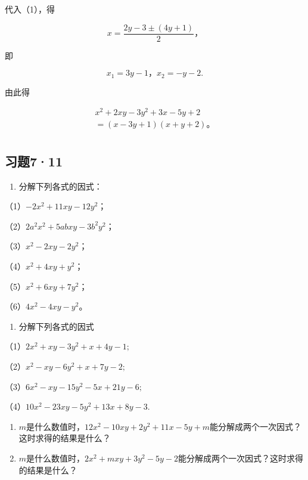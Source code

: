 代入（1），得

\[
x = \frac{2 y - 3 \pm (4 y + 1)}{2}\text{，}
\]

即

\[
x _ {1} = 3 y - 1\text{，} x _ {2} = - y - 2.
\]

由此得

\[
\begin{array}{l} x ^ {2} + 2 x y - 3 y ^ {2} + 3 x - 5 y + 2 \\ = (x - 3 y + 1) (x + y + 2)\text{。} \\ \end{array}
\]

\subsection{习题7·11}

\begin{enumerate}
\item
  分解下列各式的因式：
\end{enumerate}

（1）\(-2x^{2} + 11xy - 12y^{2}\)；

（2）\(2a^{2}x^{2} + 5abxy - 3b^{2}y^{2}\)；

（3）\(x^{2} - 2xy - 2y^{2}\)；

（4）\(x^{2} + 4xy + y^{2}\)；

（5）\(x^{2} + 6xy + 7y^{2}\)；

（6）\(4x^{2} - 4xy - y^{2}\)。

\begin{enumerate}[start=2]
\item
  分解下列各式的因式
\end{enumerate}

（1）\(2x^{2} + xy - 3y^{2} + x + 4y - 1;\)

（2）\(x^{2} - xy - 6y^{2} + x + 7y - 2;\)

（3）\(6x^{2} - xy - 15y^{2} - 5x + 21y - 6;\)

（4）\(10x^{2} - 23xy - 5y^{2} + 13x + 8y - 3.\)

\begin{enumerate}[start=3,label={*\arabic*.}]
\item
\(m\)是什么数值时，\(12x^{2} - 10xy + 2y^{2} + 11x - 5y + m\)能分解成两个一次因式？这时求得的结果是什么？

\item
\(m\)是什么数值时，\(2x^{2} + mxy + 3y^{2} - 5y - 2\)能分解成两个一次因式？这时求得的结果是什么？

\end{enumerate}
